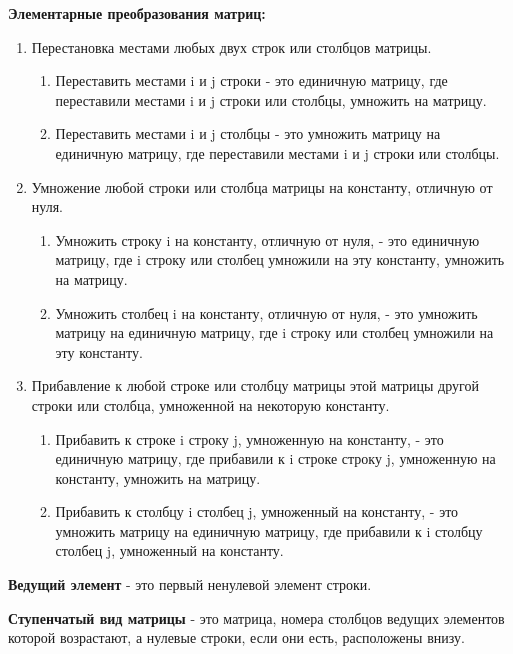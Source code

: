 \documentclass[oneside]{book}
\begin{document}
	\textbf{Элементарные преобразования матриц:}
	\begin{enumerate}
		\item Перестановка местами любых двух строк или столбцов матрицы.
		\begin{enumerate}
			\item Переставить местами i и j строки - это единичную матрицу,
			где переставили местами i и j строки или столбцы,
			умножить на матрицу.

			\item Переставить местами i и j столбцы - это умножить матрицу на единичную матрицу,
			где переставили местами i и j строки или столбцы.
		\end{enumerate}

		\item Умножение любой строки или столбца матрицы на константу,
		отличную от нуля.
		\begin{enumerate}
			\item Умножить строку i на константу, отличную от нуля, - это
			единичную матрицу,
			где i строку или столбец умножили на эту константу,
			умножить на матрицу.

			\item Умножить столбец i на константу, отличную от нуля, - это
			умножить матрицу на единичную матрицу,
			где i строку или столбец умножили на эту константу.
		\end{enumerate}

		\item Прибавление к любой строке или столбцу матрицы этой матрицы
		другой строки или столбца, умноженной на некоторую
		константу.
		\begin{enumerate}
			\item Прибавить к строке i строку j, умноженную на константу, - это
			единичную матрицу,
			где прибавили к i строке строку j, умноженную на константу,
			умножить на матрицу.

			\item Прибавить к столбцу i столбец j, умноженный на константу, - это
			умножить матрицу на единичную матрицу,
			где прибавили к i столбцу столбец j, умноженный на константу.
		\end{enumerate}
	\end{enumerate}

	\textbf{Ведущий элемент} - это
	первый ненулевой элемент строки.

	\textbf{Ступенчатый вид матрицы} - это
	матрица, номера столбцов ведущих элементов которой
	возрастают, а нулевые строки, если они есть,
	расположены внизу.
\end{document}

